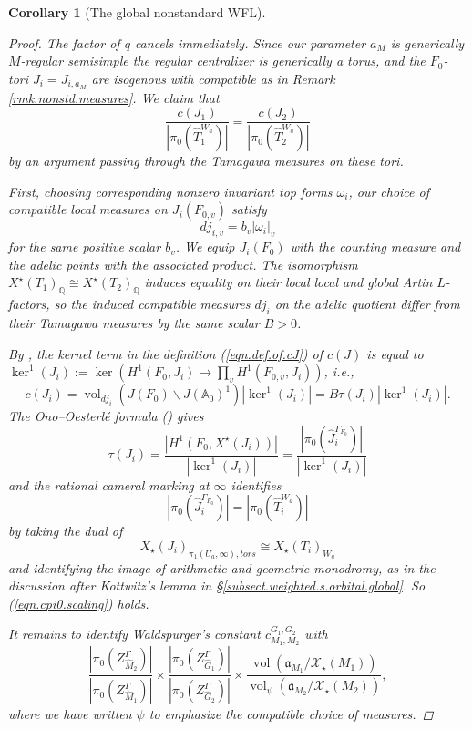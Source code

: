\documentclass[openany]{amsbook}
\newtheorem{corollary}[theorem]{Corollary}
\theoremstyle{definition}
\theoremstyle{remark}
\numberwithin{equation}{section}
\newcommand{\Q}{\mathbb{Q}}
\newcommand{\cX}{\mathcal{X}}
\newcommand{\A}{\mathbb{A}}
\newcommand{\Sha}{\ker^1}
\newcommand{\vol}{\operatorname{vol}}
\renewcommand{\-}{\operatorname{-}}
\renewcommand{\a}{\mathfrak{a}}
\renewcommand{\A}{\mathbb{A}}
\newcommand{\tors}{\mathit{tors}}
\begin{document}
\begin{corollary}[The global nonstandard WFL]
\begin{proof}
        The factor of $q$ cancels immediately. Since our parameter $a_M$ is generically $M$-regular semisimple the regular centralizer is generically a torus, and the $F_0$-tori $J_i = J_{i, a_M}$ are isogenous with compatible as in Remark \ref{rmk.nonstd.measures}. We claim that 
        \begin{equation}
            \frac{c(J_1)}{|\pi_0(\widehat{T}_1^{W_a})|} = \frac{c(J_2)}{|\pi_0(\widehat{T}_2^{W_a})|} \label{eqn.cpi0.scaling}
        \end{equation}
        by an argument passing through the Tamagawa measures on these tori.
        
        First, choosing corresponding nonzero invariant top forms $\omega_i$, our choice of compatible local measures on $J_i(F_{0,v})$ satisfy
        $$
            dj_{i,v} = b_v |\omega_i|_v
        $$
        for the same positive scalar $b_v$. We equip $J_i(F_0)$ with the counting measure and  the adelic points with the associated product. The isomorphism $X^\star(T_1)_{\Q} \cong X^\star(T_2)_{\Q}$ induces equality on their local  local and global Artin $L$-factors, so the induced compatible measures $dj_{i}$ on the adelic quotient differ from their Tamagawa measures by the same scalar $B > 0$.
        
        By \cite[Lemma 12.2.5]{CLII}, the kernel term in the definition (\ref{eqn.def.of.cJ}) of $c(J)$ is equal to $\Sha(J_i) := \ker\left(H^1(F_0, J_i) \to \prod_v H^1(F_{0,v}, J_i)\right)$, i.e.,
        $$
            c(J_i) = \vol_{dj_i}(J(F_0)\backslash J(\A_0)^1) |\Sha(J_i)| = B \tau(J_i) |\Sha(J_i)|.
        $$
        The Ono--Oesterl\'e formula (\cite{OnoTamagawa}) gives
        $$
            \tau(J_i) = \frac{|H^1(F_0, X^\star(J_i))|}{|\Sha(J_i)|} = \frac{|\pi_0(\widehat{J}_i^{\Gamma_{F_0}})|}{|\Sha(J_i)|}
        $$
        and the rational cameral marking at $\infty$ identifies
        $$
            |\pi_0(\widehat{J}_i^{\Gamma_{F_0}})| = |\pi_0(\widehat{T}_i^{W_a})|
        $$
        by taking the dual of 
        $$
            X_\star(J_{i})_{\pi_1(U_a, \infty), \tors} \cong X_\star(T_i)_{W_a}
        $$
        and identifying the image of arithmetic and geometric monodromy, 
        as in the discussion after Kottwitz's lemma in \S \ref{subsect.weighted.s.orbital.global}. So (\ref{eqn.cpi0.scaling}) holds.

        It remains to identify Waldspurger's constant 
        $c_{M_1, M_2}^{G_1, G_2}$ with
        \begin{equation}
            \frac{|\pi_0(Z^\Gamma_{\widehat{M}_2})|}{|\pi_0(Z^\Gamma_{\widehat{M}_1})|} \times \frac{|\pi_0(Z^\Gamma_{\widehat{G}_1})|}{|\pi_0(Z^\Gamma_{\widehat{G}_2})|} \times \frac{\vol(\a_{M_1}/\cX_\star(M_1))}{\vol_{\psi}(\a_{M_2}/\cX_\star(M_2))},\label{eqn.lattice.constant.Walds}
        \end{equation}
        where we have written $\psi$ to emphasize the compatible choice of measures.
        

\end{proof}
\end{corollary}
\end{document}
